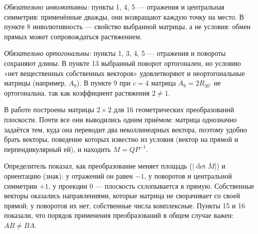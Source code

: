 \documentclass[a4paper,14pt]{extarticle}
\begin{document}
\emph{Обязательно инволютивны:} пункты 1, 4, 5 --- отражения и
центральная симметрия: применённые дважды, они возвращают каждую точку
на место. В пункте 8 инволютивность --- свойство выбранной матрицы, а не
условия: обмен прямых может сопровождаться растяжением.

\emph{Обязательно ортогональны:} пункты 1, 3, 4, 5 --- отражения и
повороты сохраняют длины. В пункте 13 выбранный поворот ортогонален, но
условию «нет вещественных собственных векторов» удовлетворяют и
неортогональные матрицы (например, \(A_9\)). В пункте 9 при \(c=4\)
матрица \(A_9=2R_{30^\circ}\) не ортогональна, так как коэффициент
растяжения \(2\ne1\).


В работе построены матрицы $2\times2$ для 16 геометрических преобразований плоскости. Почти все они
выводились одним приёмом: матрица однозначно задаётся тем, куда она переводит два неколлинеарных
вектора, поэтому удобно брать векторы, поведение которых известно из условия (вектор на прямой и
перпендикулярный ей), и находить $M = QP^{-1}$.

Определитель показал, как преобразование меняет площадь ($|\det M|$) и ориентацию (знак): у отражений
он равен $-1$, у поворотов и центральной симметрии $+1$, у проекции $0$ — плоскость схлопывается в прямую.
Собственные векторы оказались направлениями, которые матрица не сворачивает со своей прямой; у поворотов
их нет, собственные числа комплексные. Пункты 15 и 16 показали, что порядок применения преобразований
в общем случае важен: $AB \ne BA$.

\newpage
{}




\end{document}
